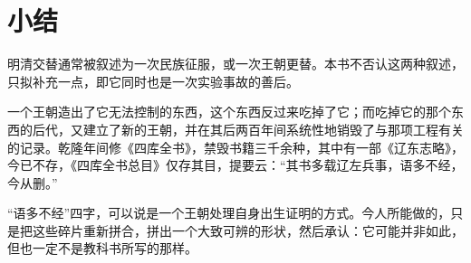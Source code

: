 \section{小结}

明清交替通常被叙述为一次民族征服，或一次王朝更替。本书不否认这两种叙述，只拟补充一点，即它同时也是一次实验事故的善后。

一个王朝造出了它无法控制的东西，这个东西反过来吃掉了它；而吃掉它的那个东西的后代，又建立了新的王朝，并在其后两百年间系统性地销毁了与那项工程有关的记录。乾隆年间修《四库全书》，禁毁书籍三千余种，其中有一部《辽东志略》，今已不存，《四库全书总目》仅存其目，提要云：“其书多载辽左兵事，语多不经，今从删。”

“语多不经”四字，可以说是一个王朝处理自身出生证明的方式。今人所能做的，只是把这些碎片重新拼合，拼出一个大致可辨的形状，然后承认：它可能并非如此，但也一定不是教科书所写的那样。

